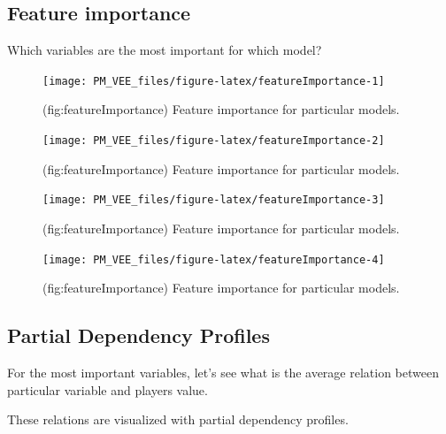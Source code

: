 \documentclass[12pt,]{krantz}
\begin{document}
\hypertarget{feature-importance}{%
\subsection{Feature importance}\label{feature-importance}}

Which variables are the most important for which model?

\begin{figure}

{\centering \texttt{[image: PM\_VEE\_files/figure-latex/featureImportance-1]} 

}

\caption{(fig:featureImportance) Feature importance for particular models.}\label{fig:featureImportance1}
\end{figure}
\begin{figure}

{\centering \texttt{[image: PM\_VEE\_files/figure-latex/featureImportance-2]} 

}

\caption{(fig:featureImportance) Feature importance for particular models.}\label{fig:featureImportance2}
\end{figure}
\begin{figure}

{\centering \texttt{[image: PM\_VEE\_files/figure-latex/featureImportance-3]} 

}

\caption{(fig:featureImportance) Feature importance for particular models.}\label{fig:featureImportance3}
\end{figure}
\begin{figure}

{\centering \texttt{[image: PM\_VEE\_files/figure-latex/featureImportance-4]} 

}

\caption{(fig:featureImportance) Feature importance for particular models.}\label{fig:featureImportance4}
\end{figure}

\hypertarget{partial-dependency-profiles}{%
\subsection{Partial Dependency Profiles}\label{partial-dependency-profiles}}

For the most important variables, let's see what is the average relation between particular variable and players value.

These relations are visualized with partial dependency profiles.
\end{document}
